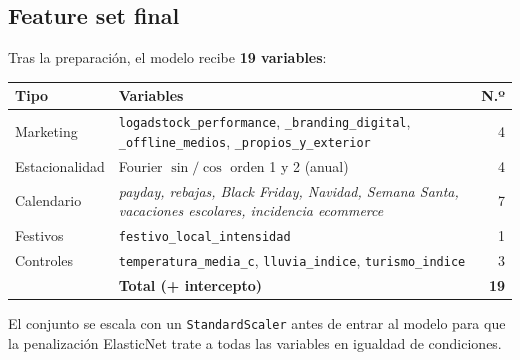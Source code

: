 \subsection{Feature set final}

Tras la preparación, el modelo recibe \textbf{19 variables}:

\begin{center}
\begin{tabular}{@{}p{3.5cm} p{8.5cm} r@{}}
\toprule
\textbf{Tipo} & \textbf{Variables} & \textbf{N.º} \\
\midrule
\textcolor{kmgolddark}{Marketing}      & \texttt{logadstock\_performance}, \texttt{\_branding\_digital}, \texttt{\_offline\_medios}, \texttt{\_propios\_y\_exterior} & 4 \\
\textcolor{kmgolddark}{Estacionalidad} & Fourier $\sin/\cos$ orden 1 y 2 (anual) & 4 \\
\textcolor{kmgolddark}{Calendario}     & \textit{payday, rebajas, Black Friday, Navidad, Semana Santa, vacaciones escolares, incidencia ecommerce} & 7 \\
\textcolor{kmgolddark}{Festivos}       & \texttt{festivo\_local\_intensidad} & 1 \\
\textcolor{kmgolddark}{Controles}      & \texttt{temperatura\_media\_c}, \texttt{lluvia\_indice}, \texttt{turismo\_indice} & 3 \\
\midrule
 & \textbf{Total (+ intercepto)} & \textbf{19} \\
\bottomrule
\end{tabular}
\end{center}

El conjunto se escala con un \texttt{StandardScaler} antes de entrar al modelo para que la penalización ElasticNet trate a todas las variables en igualdad de condiciones.
